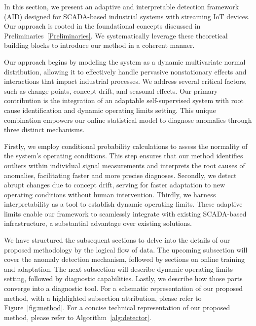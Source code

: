 In this section, we present an adaptive and interpretable detection framework (AID) designed for SCADA-based industrial systems with streaming IoT devices. Our approach is rooted in the foundational concepts discussed in Preliminaries~\ref{Preliminaries}. We systematically leverage these theoretical building blocks to introduce our method in a coherent manner.

Our approach begins by modeling the system as a dynamic multivariate normal distribution, allowing it to effectively handle pervasive nonstationary effects and interactions that impact industrial processes. We address several critical factors, such as change points, concept drift, and seasonal effects. Our primary contribution is the integration of an adaptable self-supervised system with root cause identification and dynamic operating limits setting. This unique combination empowers our online statistical model to diagnose anomalies through three distinct mechanisms.

Firstly, we employ conditional probability calculations to assess the normality of the system's operating conditions. This step ensures that our method identifies outliers within individual signal measurements and interprets the root causes of anomalies, facilitating faster and more precise diagnoses. Secondly, we detect abrupt changes due to concept drift, serving for faster adaptation to new operating conditions without human intervention. Thirdly, we harness interpretability as a tool to establish dynamic operating limits. These adaptive limits enable our framework to seamlessly integrate with existing SCADA-based infrastructure, a substantial advantage over existing solutions.

We have structured the subsequent sections to delve into the details of our proposed methodology by the logical flow of data. The upcoming subsection will cover the anomaly detection mechanism, followed by sections on online training and adaptation. The next subsection will describe dynamic operating limits setting, followed by diagnostic capabilities. Lastly, we describe how those parts converge into a diagnostic tool. For a schematic representation of our proposed method, with a highlighted subsection attribution, please refer to Figure~\ref{fig:method}. For a concise technical representation of our proposed method, please refer to Algorithm~\ref{alg:detector}.

